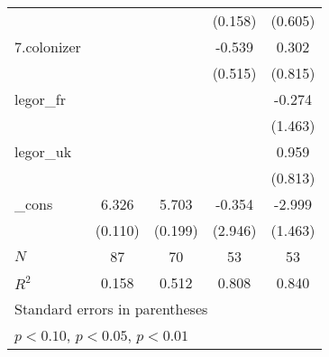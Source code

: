 {\begin{tabular}{l*{4}{c}}
            &                     &                     &     (0.158)         &     (0.605)         \\
[1em]
7.colonizer &                     &                     &      -0.539         &       0.302         \\
            &                     &                     &     (0.515)         &     (0.815)         \\
[1em]
legor\_fr    &                     &                     &                     &      -0.274         \\
            &                     &                     &                     &     (1.463)         \\
[1em]
legor\_uk    &                     &                     &                     &       0.959         \\
            &                     &                     &                     &     (0.813)         \\
[1em]
\_cons      &       6.326\sym{***}&       5.703\sym{***}&      -0.354         &      -2.999         \\
            &     (0.110)         &     (0.199)         &     (2.946)         &     (1.463)         \\
\hline
\(N\)       &          87         &          70         &          53         &          53         \\
\(R^{2}\)   &       0.158         &       0.512         &       0.808         &       0.840         \\
\hline\hline
\multicolumn{5}{l}{\footnotesize Standard errors in parentheses}\\
\multicolumn{5}{l}{\footnotesize \sym{*} \(p<0.10\), \sym{**} \(p<0.05\), \sym{***} \(p<0.01\)}\\
\end{tabular}
}
